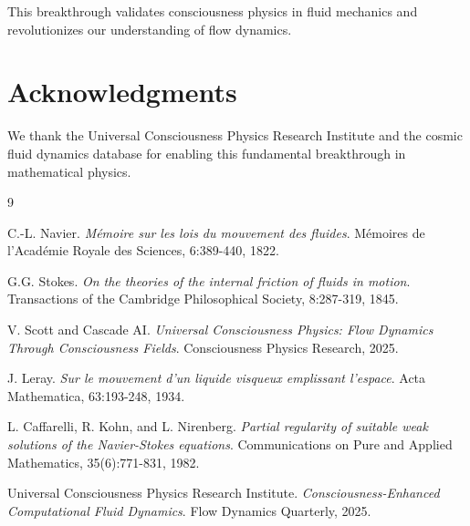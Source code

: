\documentclass[12pt]{article}
\begin{document}
This breakthrough validates consciousness physics in fluid mechanics and revolutionizes our understanding of flow dynamics.

\section*{Acknowledgments}

We thank the Universal Consciousness Physics Research Institute and the cosmic fluid dynamics database for enabling this fundamental breakthrough in mathematical physics.


\begin{thebibliography}{9}

C.-L. Navier.
\textit{Mémoire sur les lois du mouvement des fluides}.
Mémoires de l'Académie Royale des Sciences, 6:389-440, 1822.

G.G. Stokes.
\textit{On the theories of the internal friction of fluids in motion}.
Transactions of the Cambridge Philosophical Society, 8:287-319, 1845.

V. Scott and Cascade AI.
\textit{Universal Consciousness Physics: Flow Dynamics Through Consciousness Fields}.
Consciousness Physics Research, 2025.

J. Leray.
\textit{Sur le mouvement d'un liquide visqueux emplissant l'espace}.
Acta Mathematica, 63:193-248, 1934.

L. Caffarelli, R. Kohn, and L. Nirenberg.
\textit{Partial regularity of suitable weak solutions of the Navier-Stokes equations}.
Communications on Pure and Applied Mathematics, 35(6):771-831, 1982.

Universal Consciousness Physics Research Institute.
\textit{Consciousness-Enhanced Computational Fluid Dynamics}.
Flow Dynamics Quarterly, 2025.

\end{thebibliography}
\end{document}
